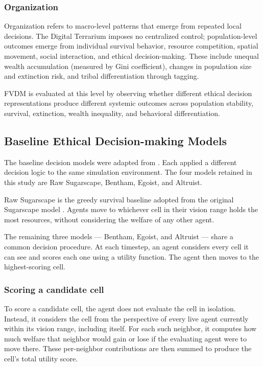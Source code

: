 \documentclass{icsthesis}
\begin{document}
\begin{mainmatter}
\subsubsection{Organization}
Organization refers to macro-level patterns that emerge from repeated local decisions. The Digital Terrarium imposes no centralized control; population-level outcomes emerge from individual survival behavior, resource competition, spatial movement, social interaction, and ethical decision-making. These include unequal wealth accumulation (measured by Gini coefficient), changes in population size and extinction risk, and tribal differentiation through tagging.

FVDM is evaluated at this level by observing whether different ethical decision representations produce different systemic outcomes across population stability, survival, extinction, wealth inequality, and behavioral differentiation.


\subsection{Baseline Ethical Decision-making Models}

The baseline decision models were adapted from \citet{KremerHerman2024b}. Each applied a different decision logic to the same simulation environment. The four models retained in this study are Raw Sugarscape, Bentham, Egoist, and Altruist.

Raw Sugarscape is the greedy survival baseline adopted from the original Sugarscape model \citep[as cited in][]{KremerHerman2024b}. Agents move to whichever cell in their vision range holds the most resources, without considering the welfare of any other agent.

The remaining three models --- Bentham, Egoist, and Altruist --- share a common decision procedure. At each timestep, an agent considers every cell it can see and scores each one using a utility function. The agent then moves to the highest-scoring cell.

\subsubsection*{Scoring a candidate cell}

To score a candidate cell, the agent does not evaluate the cell in isolation. Instead, it considers the cell from the perspective of every live agent currently within its vision range, including itself. For each such neighbor, it computes how much welfare that neighbor would gain or lose if the evaluating agent were to move there. These per-neighbor contributions are then summed to produce the cell’s total utility score.


\end{mainmatter}
\end{document}

